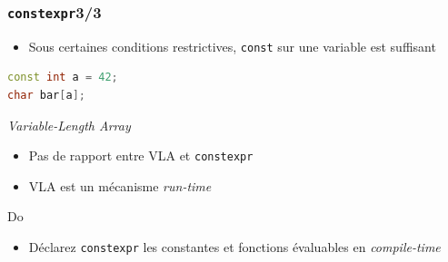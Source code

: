 \documentclass[C++.tex]{subfiles}
\begin{document}
\begin{frame}[fragile]
	\frametitle{\lstinline|constexpr|\titlehfill{}3/3}
	\begin{itemize}
		\item Sous certaines conditions restrictives, \lstinline|const| sur une variable est suffisant

	\end{itemize}

	\begin{lstlisting}[language=C++]
const int a = 42;
char bar[a];\end{lstlisting}

	\begin{alertblock}{\textit{Variable-Length Array}}
		\begin{itemize}
			\item Pas de rapport entre VLA et \lstinline|constexpr|
			\item VLA est un mécanisme \textit{run-time}
		\end{itemize}
	\end{alertblock}


	\begin{exampleblock}{Do}
		\begin{itemize}
			\item Déclarez \lstinline|constexpr| les constantes et fonctions évaluables en \textit{compile-time}
		\end{itemize}
	\end{exampleblock}
\end{frame}
\end{document}
